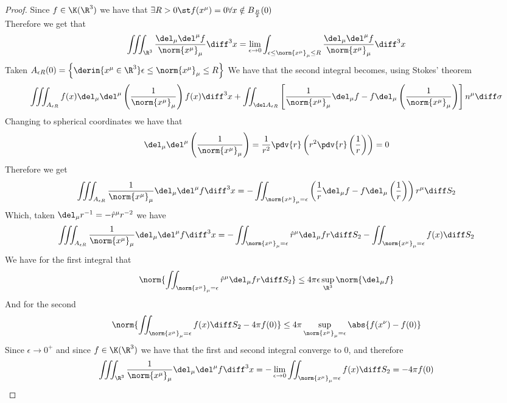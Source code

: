 \documentclass[../mmf.tex]{subfiles}
\begin{document}
\begin{proof}
	Since $f\in\K(\R^3)$ we have that $\exists R>0\st f(x^\mu)=0\forall x\notin B_{\frac{R}{2}}(0)$\\
	Therefore we get that
	\begin{equation*}
		\iiint_{\R^3}\frac{\del_\mu\del^\mu f}{\norm{x^\mu}_\mu}\diff^3x=\lim_{\epsilon\to0}\int_{\epsilon\le\norm{x^\mu}_\mu\le R}\frac{\del_\mu\del^\mu f}{\norm{x^\mu}_\mu}\diff^3x
	\end{equation*}
	Taken $A_{\epsilon R}(0)=\left\{ \derin{x^\mu\in\R^3}\epsilon\le\norm{x^\mu}_\mu\le R \right\}$ We have that the second integral becomes, using Stokes' theorem
	\begin{equation*}
		\iiint_{A_{\epsilon R}}f(x)\del_\mu\del^\mu\left( \frac{1}{\norm{x^\mu}_\mu} \right)f(x)\diff^3x+\iint_{\del A_{\epsilon R}}\left[ \frac{1}{\norm{x^\mu}_\mu}\del_\mu f-f\del_\mu\left( \frac{1}{\norm{x^\mu}_\mu} \right) \right]n^\mu\diff\sigma
	\end{equation*}
	Changing to spherical coordinates we have that
	\begin{equation*}
		\del_\mu\del^\mu\left( \frac{1}{\norm{x^\mu}_\mu} \right)=\frac{1}{r^2}\pdv{r}\left( r^2\pdv{r}\left( \frac{1}{r} \right) \right)=0
	\end{equation*}
	Therefore we get
	\begin{equation*}
		\iiint_{A_{\epsilon R}}\frac{1}{\norm{x^\mu}_\mu}\del_\mu\del^\mu f\diff^3x=-\iint_{\norm{x^\mu}_\mu=\epsilon}\left( \frac{1}{r}\del_\mu f-f\del_\mu\left( \frac{1}{r} \right) \right)r^\mu\diff S_2
	\end{equation*}
	Which, taken $\del_{\mu}r^{-1}=-\hat{r}^\mu r^{-2}$ we have
	\begin{equation*}
		\iiint_{A_{\epsilon R}}\frac{1}{\norm{x^\mu}_\mu}\del_\mu\del^\mu f\diff^3x=-\iint_{\norm{x^\mu}_\mu=\epsilon}\hat{r}^\mu\del_\mu fr\diff S_2-\iint_{\norm{x^\mu}_\mu=\epsilon}f(x)\diff S_2
	\end{equation*}
	We have for the first integral that
	\begin{equation*}
		\norm{\iint_{\norm{x^\mu}_\mu=\epsilon}\hat{r}^\mu\del_\mu fr\diff S_2}\le4\pi\epsilon\sup_{\R^3}\norm{\del_\mu f}
	\end{equation*}
	And for the second
	\begin{equation*}
		\norm{\iint_{\norm{x^\mu}_\mu=\epsilon}f(x)\diff S_2-4\pi f(0)}\le4\pi\sup_{\norm{x^\mu}_\mu=\epsilon}\abs{f(x^\nu)-f(0)}
	\end{equation*}
	Since $\epsilon\to0^+$ and since $f\in\K(\R^3)$ we have that the first and second integral converge to $0$, and therefore
	\begin{equation*}
		\iiint_{\R^3}\frac{1}{\norm{x^\mu}_\mu}\del_\mu\del^\mu f\diff^3x=-\lim_{\epsilon\to0}\iint_{\norm{x^\mu}_\mu=\epsilon}f(x)\diff S_2=-4\pi f(0)
	\end{equation*}
\end{proof}
\end{document}
